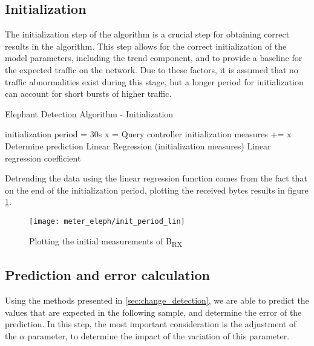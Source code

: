 \subsection{Initialization}

The initialization step of the algorithm is a crucial step for obtaining correct results in the algorithm. This step allows for the correct initialization of the
model parameters, including the trend component, and to provide a baseline for the expected traffic on the network. Due to these factors, it is assumed that no 
traffic abnormalities exist during this stage, but a longer period for initialization can account for short bursts of higher traffic.

\begin{algorithm}[H]
    \caption{Elephant Detection Algorithm - Initialization} \label{alg:init}
    \begin{algorithmic}[1]
            \State initialization period = 30s
                \State x = Query controller
                \State initialization measures += x
                \State Determine prediction
            \EndWhile
            \State Linear Regression (initialization measures)
        \State \Return Linear regression coefficient
    \end{algorithmic}
\end{algorithm}

\par Detrending the data using the linear regression function comes from the fact that on the end of the initialization period, plotting the received bytes results
in figure \ref{fig:init_plot}.

\begin{figure} 
    \centering
    \texttt{[image: meter\_eleph/init\_period\_lin]}
    \caption {Plotting the initial measurements of B\textsubscript{RX}}
    \label{fig:init_plot}
\end{figure} 

\subsection{Prediction and error calculation}

Using the methods presented in \ref{sec:change_detection}, we are able to predict the values that are expected in the following sample, and determine the error of
the prediction. In this step, the most important consideration is the adjustment of the $\alpha$ parameter, to determine the impact of the variation of
this parameter.

